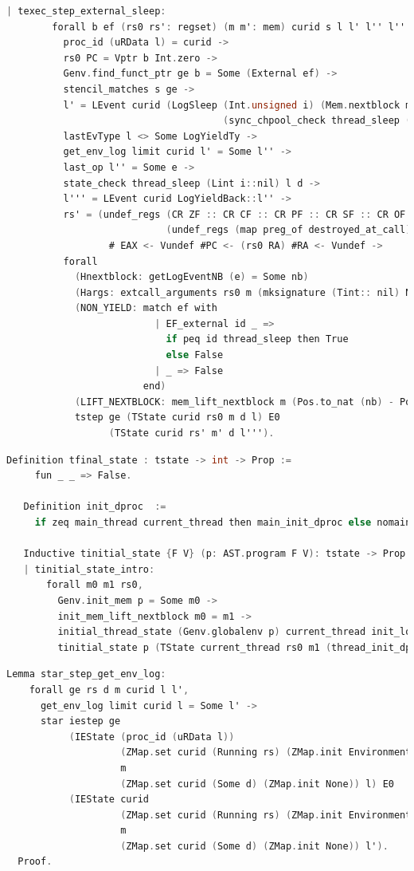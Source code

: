 \begin{lstlisting}[language=C]
    | texec_step_external_sleep:
        forall b ef (rs0 rs': regset) (m m': mem) curid s l l' l'' l''' nb d e i,
          proc_id (uRData l) = curid ->
          rs0 PC = Vptr b Int.zero ->
          Genv.find_funct_ptr ge b = Some (External ef) ->
          stencil_matches s ge ->
          l' = LEvent curid (LogSleep (Int.unsigned i) (Mem.nextblock m)
                                      (sync_chpool_check thread_sleep ((Lint i)::nil) (uRData l) d))::l ->
          lastEvType l <> Some LogYieldTy ->
          get_env_log limit curid l' = Some l'' ->
          last_op l'' = Some e ->
          state_check thread_sleep (Lint i::nil) l d ->
          l''' = LEvent curid LogYieldBack::l'' ->
          rs' = (undef_regs (CR ZF :: CR CF :: CR PF :: CR SF :: CR OF :: nil)
                            (undef_regs (map preg_of destroyed_at_call) rs0)) 
                  # EAX <- Vundef #PC <- (rs0 RA) #RA <- Vundef ->
          forall
            (Hnextblock: getLogEventNB (e) = Some nb)
            (Hargs: extcall_arguments rs0 m (mksignature (Tint:: nil) None cc_default) (Vint i:: nil))
            (NON_YIELD: match ef with
                          | EF_external id _ => 
                            if peq id thread_sleep then True
                            else False
                          | _ => False
                        end)
            (LIFT_NEXTBLOCK: mem_lift_nextblock m (Pos.to_nat (nb) - Pos.to_nat (Mem.nextblock m) % nat) = m'),
            tstep ge (TState curid rs0 m d l) E0
                  (TState curid rs' m' d l''').
\end{lstlisting}

\begin{lstlisting}[language=C]
   Definition tfinal_state : tstate -> int -> Prop :=
     fun _ _ => False.
   
   Definition init_dproc  :=
     if zeq main_thread current_thread then main_init_dproc else nomain_init_dproc.

   Inductive tinitial_state {F V} (p: AST.program F V): tstate -> Prop :=
   | tinitial_state_intro: 
       forall m0 m1 rs0,
         Genv.init_mem p = Some m0 ->
         init_mem_lift_nextblock m0 = m1 ->
         initial_thread_state (Genv.globalenv p) current_thread init_log = Some rs0 ->
         tinitial_state p (TState current_thread rs0 m1 (thread_init_dproc current_thread) init_log).
\end{lstlisting}

\begin{lstlisting}[language=C]
  Lemma star_step_get_env_log:
    forall ge rs d m curid l l',
      get_env_log limit curid l = Some l' ->
      star iestep ge
           (IEState (proc_id (uRData l))
                    (ZMap.set curid (Running rs) (ZMap.init Environment))
                    m
                    (ZMap.set curid (Some d) (ZMap.init None)) l) E0
           (IEState curid
                    (ZMap.set curid (Running rs) (ZMap.init Environment))
                    m
                    (ZMap.set curid (Some d) (ZMap.init None)) l').
  Proof.
\end{lstlisting}

